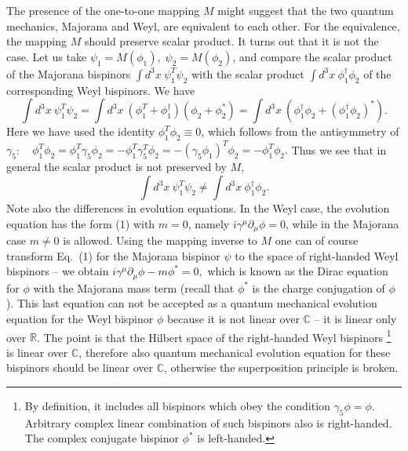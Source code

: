 \documentclass[12pt]{article}
\begin{document}
 The presence of the  one-to-one mapping $M$ might suggest that  the two  quantum mechanics, Majorana and Weyl,   are equivalent to each other.   For the equivalence,  the mapping $M$ should preserve scalar product. It turns out that it is not the case. Let us take $\psi_1= M(\phi_1), \; \psi_2 = M(\phi_2)$,  and compare  the  scalar product of the Majorana bispinors  $\int\! d^3x \: \psi^T_1 \psi_2$ with the scalar product  $\int\! d^3x \: \phi^{\dagger}_1 \phi_2$ of the corresponding Weyl bispinors. We have
\[  \int\!\! d^3x \: \psi_1^T \psi_2   = \int\! \!d^3x\:(\phi_1^T + \phi_1^{\dagger}) (\phi_2 +\phi_2^*) = \int\!\! d^3x\:(\phi_1^{\dagger} \phi_2 + (\phi_1^{\dagger} \phi_2)^*).  \]
Here we have used the identity $\phi_1^T \phi_2 \equiv 0$,  which follows from the antisymmetry of $\gamma_5$: $\;\;\;\phi_1^T \phi_2 = \phi_1^T \gamma_5\phi_2=- \phi_1^T \gamma_5^T\phi_2= -(\gamma_5\phi_1)^T \phi_2 = - \phi_1^T \phi_2.$
Thus we see that in general the scalar product is not preserved  by $M$, 
  \[ \int\!\! d^3x \: \psi_1^T \psi_2  \neq \int\!\! d^3x \: \phi_1^{\dagger} \phi_2.   \] 
Note also the differences in evolution equations. In the Weyl case,  the evolution equation has the form (1) with $m=0$, namely $  i \gamma^{\mu} \partial_{\mu} \phi =0$, while in the Majorana case $m\neq 0$ is allowed.  Using the mapping inverse to $M$ one can  of course transform Eq.\
(1) for the Majorana bispinor $\psi$ to the space of right-handed Weyl bispinors -- we obtain  
$  i \gamma^{\mu} \partial_{\mu} \phi - m \phi^* =0,$
which is known as  the Dirac equation for $\phi$  with the Majorana mass term (recall that $\phi^*$ is the charge conjugation of $\phi$).   
This last equation can not be accepted as a quantum mechanical evolution equation for the Weyl bispinor $\phi$ because  it is not linear over $\mathbb{C}$ -- it is linear only over $\mathbb{R}$.  The point is that the Hilbert space of the right-handed Weyl bispinors \footnote{By definition, it includes all bispinors which obey the condition $\gamma_5 \phi = \phi$. Arbitrary complex linear combination  of such bispinors  also is right-handed.  The complex conjugate bispinor $\phi^*$ is left-handed.} is linear over $\mathbb{C}$,  therefore also quantum mechanical evolution equation for these bispinors  should be linear over $\mathbb{C}$, otherwise  the superposition principle  is broken.  
\end{document}

